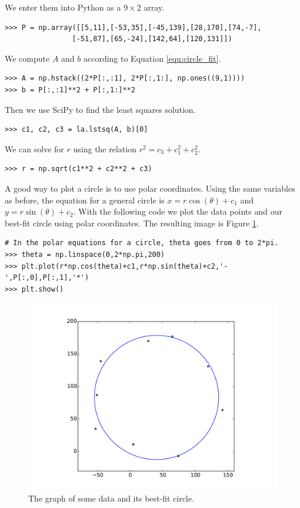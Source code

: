 We enter them into Python as a $9\times 2$ array.

\begin{lstlisting}
>>> P = np.array([[5,11],[-53,35],[-45,139],[28,170],[74,-7],
                [-51,87],[65,-24],[142,64],[120,131]])
\end{lstlisting}

We compute $A$ and $b$ according to Equation \ref{equ:circle_fit}.

\begin{lstlisting}
>>> A = np.hstack((2*P[:,:1], 2*P[:,1:], np.ones((9,1))))
>>> b = P[:,:1]**2 + P[:,1:]**2
\end{lstlisting}

Then we use SciPy to find the least squares solution.

\begin{lstlisting}
>>> c1, c2, c3 = la.lstsq(A, b)[0]
\end{lstlisting}

We can solve for $r$ using the relation $r^2 = c_3+c_1^2+c_2^2$.

\begin{lstlisting}
>>> r = np.sqrt(c1**2 + c2**2 + c3)
\end{lstlisting}

A good way to plot a circle is to use polar coordinates.
Using the same variables as before, the equation for a general circle is $x=r\cos(\theta)+c_1$ and $y=r\sin(\theta)+c_2$.
With the following code we plot the data points and our best-fit circle using polar coordinates.
The resulting image is Figure \ref{fig:circle}.

\begin{lstlisting}
# In the polar equations for a circle, theta goes from 0 to 2*pi.
>>> theta = np.linspace(0,2*np.pi,200)
>>> plt.plot(r*np.cos(theta)+c1,r*np.sin(theta)+c2,'-',P[:,0],P[:,1],'*')
>>> plt.show()
\end{lstlisting}

\begin{figure}[H]
\includegraphics[width=\textwidth]{circle.pdf}
\caption{The graph of some data and its best-fit circle.}
\label{fig:circle}
\end{figure}

